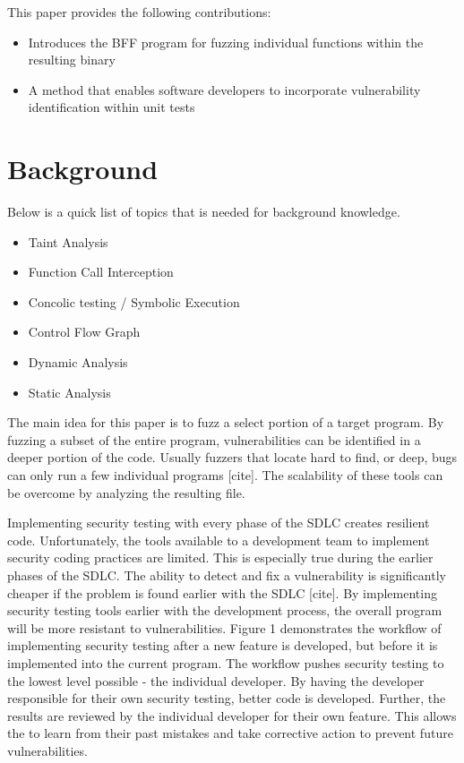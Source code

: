 \documentclass[conference]{IEEEtran}
\begin{document}
This paper provides the following contributions:
\begin{itemize}
\item Introduces the BFF program for fuzzing individual functions within the resulting binary
\item A method that enables software developers to incorporate vulnerability identification within unit tests
\end{itemize}


\section{Background}
Below is a quick list of topics that is needed for background knowledge.

\begin{itemize}
\item Taint Analysis
\item Function Call Interception
\item Concolic testing / Symbolic Execution
\item Control Flow Graph
\item Dynamic Analysis
\item Static Analysis
\end{itemize}

The main idea for this paper is to fuzz a select portion of a target program. By fuzzing a subset of the entire program, vulnerabilities can be identified in a deeper portion of the code. Usually fuzzers that locate hard to find, or deep, bugs can only run a few individual programs [cite]. The scalability of these tools can be overcome by analyzing the resulting file. 

Implementing security testing with every phase of the SDLC creates resilient code. Unfortunately, the tools available to a development team to implement security coding practices are limited. This is especially true during the earlier phases of the SDLC. The ability to detect and fix a vulnerability is significantly cheaper if the problem is found earlier with the SDLC [cite]. By implementing security testing tools earlier with the development process, the overall program will be more resistant to vulnerabilities. Figure 1 demonstrates the workflow of implementing security testing after a new feature is developed, but before it is implemented into the current program. The workflow pushes security testing to the lowest level possible - the individual developer. By having the developer responsible for their own security testing, better code is developed. Further, the results are reviewed by the individual developer for their own feature. This allows the to learn from their past mistakes and take corrective action to prevent future vulnerabilities. 
\end{document}

